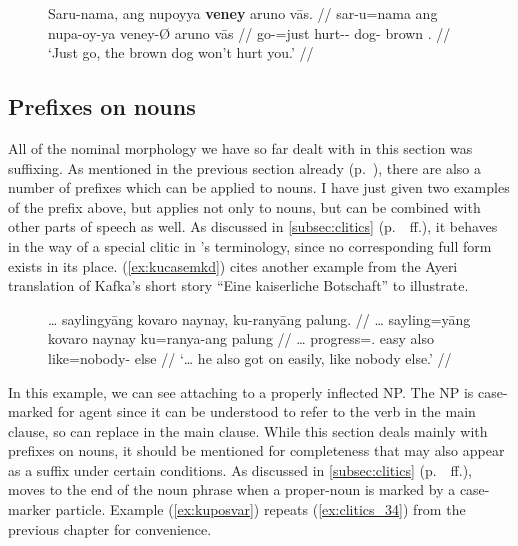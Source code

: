 \begin{figure}[h]
\ex\label{ex:topzeromkd}
\begingl
	\gla Saru-nama, ang nupoyya \textbf{veney} aruno vās. //
	\glb sar-u=nama ang nupa-oy-ya veney-Ø aruno vās //
	\glc go-\Imp{}=just \AgtT{} hurt-\Neg{}-\TsgM{} dog-\Top{} brown 
		\Second{}.\Parg{} //
	\glft `Just go, the brown dog won't hurt you.' //
\endgl\xe
\end{figure}


\subsection{Prefixes on nouns}
\label{subsec:nounpref}

All of the nominal morphology we have so far dealt with in this section was
suffixing. As mentioned in the previous section already
(p.~\pageref{nounprefixes}), there are also a number of prefixes which can be
applied to nouns. I have just given two examples of the prefix
 above, but  applies not only
to nouns, but can be combined with other parts of speech as well. As discussed
in \autoref{subsec:clitics} (p.~\pageref{clitics_prenoun_ku}~ff.), it behaves
in the way of a special clitic in \citet{zwicky1977}'s terminology, since no
corresponding full form exists in its place. (\ref{ex:kucasemkd}) cites another
example from the Ayeri translation of Kafka's short story \enquote{Eine
kaiserliche Botschaft} to illustrate.

\begin{figure}[h]
\ex\label{ex:kucasemkd}
\label{ex:kukafka2}\begingl
	\gla … saylingyāng kovaro naynay, ku-ranyāng palung. //
	\glb … sayling=yāng kovaro naynay ku=ranya-ang palung //
	\glc … progress=\TsgM{}.\Aarg{} easy also like=nobody-\Aarg{} else //
	\glft `… he also got on easily, like nobody else.'%
	//
\endgl\xe
\end{figure}

In this example, we can see  attaching to a properly inflected
NP. The NP  is case-marked for
agent since it can be understood to refer to the verb
 in the main clause, so  can replace  in the
main clause. While this section deals mainly with prefixes on nouns, it should
be mentioned for completeness that  may also appear as a suffix
under certain conditions. As discussed in \autoref{subsec:clitics}
(p.~\pageref{clitics_prenoun_ku}~ff.),  moves to the end of the
noun phrase when a proper-noun is marked by a case-marker particle. Example
(\ref{ex:kuposvar}) repeats (\ref{ex:clitics_34}) from the previous chapter for
convenience.

